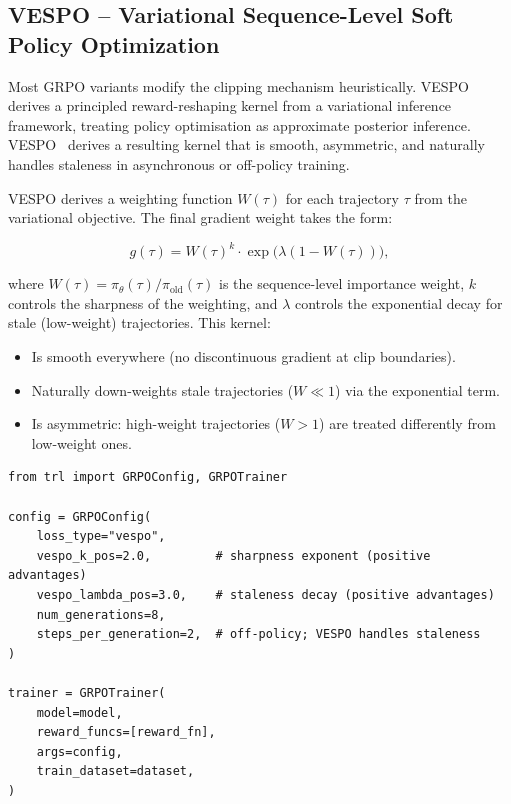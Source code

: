 \subsection{VESPO -- Variational Sequence-Level Soft Policy Optimization}
\label{sec:vespo}

\begin{intuitionbox}
Most GRPO variants modify the clipping mechanism heuristically. VESPO derives a principled reward-reshaping kernel from a variational inference framework, treating policy optimisation as approximate posterior inference. VESPO~\cite{luo2025vespo} derives a resulting kernel that is smooth, asymmetric, and naturally handles staleness in asynchronous or off-policy training.
\end{intuitionbox}

VESPO derives a weighting function $W(\tau)$ for each trajectory $\tau$ from the variational objective. The final gradient weight takes the form:

\[
\boxed{
    g(\tau) = W(\tau)^k \cdot \exp\!\bigl(\lambda(1 - W(\tau))\bigr),
  }
\]

where $W(\tau) = \pi_\theta(\tau)/\pi_{\text{old}}(\tau)$ is the sequence-level importance weight, $k$ controls the sharpness of the weighting, and $\lambda$ controls the exponential decay for stale (low-weight) trajectories. This kernel:

\begin{itemize}
  \item Is smooth everywhere (no discontinuous gradient at clip boundaries).
  \item Naturally down-weights stale trajectories ($W \ll 1$) via the exponential term.
  \item Is asymmetric: high-weight trajectories ($W > 1$) are treated differently from low-weight ones.
\end{itemize}

\begin{examplebox}
\begin{lstlisting}[style=pythonstyle]
from trl import GRPOConfig, GRPOTrainer

config = GRPOConfig(
    loss_type="vespo",
    vespo_k_pos=2.0,         # sharpness exponent (positive advantages)
    vespo_lambda_pos=3.0,    # staleness decay (positive advantages)
    num_generations=8,
    steps_per_generation=2,  # off-policy; VESPO handles staleness
)

trainer = GRPOTrainer(
    model=model,
    reward_funcs=[reward_fn],
    args=config,
    train_dataset=dataset,
)
\end{lstlisting}
\end{examplebox}

